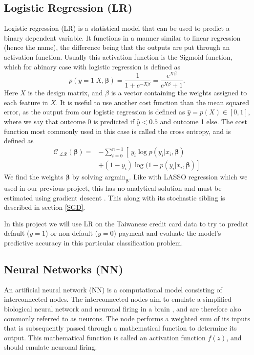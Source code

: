 \documentclass[a4paper, 11pt, twocolumn]{article}
\begin{document}
\subsection{Logistic Regression (LR)}
Logistic regression (LR)  is a statistical model that can be used to predict a
binary dependent variable. It functions in a manner similar to linear regression
(hence the name), the difference being that the outputs are put through an
activation function. Usually this activation function is the Sigmoid function,
which for abinary case with logistic regression is defined as
\begin{equation}
p(y=1 | X, \bm{\beta}) = \frac{1}{1 + e^{-X \beta}} =\frac{e^{X \beta}}{e^{X \beta}+1}.
\label{sigmoid}
\end{equation}
Here $X$ is the design matrix, and $\beta$ is a vector containing the weights
assigned to each
feature in $X$. It is useful to use another cost function than the mean squared
error, as the output
from our logistic regression is defined as $\hat{y}=p(X)\in [0, 1]$, where we
say that outcome 0 is predicted if $\hat{y}< 0.5$ and outcome 1 else. The cost
function most commonly used in this case is called the cross entropy, and is
defined as
\begin{align}
\mathcal{C_\text{ LR}}(\bm{\beta}) =& -\sum_{i=0}^{n-1} \left[\  y_i\log p(y_i|x_i, \bm{\beta}) \right. \nonumber\\
 &\left.+ (1-y_i)\log(1-p(y_i|x_i,\bm{\beta})    \right]
\end{align}
We find the weights $\bm{\beta}$ by solving $\text{argmin}_{\bm{\beta}}$. Like with
LASSO regression which we used in our previous project, this has no analytical
solution and must be estimated using gradient descent \cite{regpaper}. This
along with its stochastic sibling is described in section \ref{SGD}.

In this project we will use LR on the Taiwanese credit card data to try to predict
default ($y=1$) or non-default ($y=0$) payment and evaluate the model's predictive
accuracy in this particular classification problem.

\subsection{Neural Networks (NN)}

An artificial neural network (NN) is a computational model consisting of
interconnected nodes. The interconnected nodes aim to emulate a simplified
biological neural network and neuronal firing in a brain , and are therefore
also commonly referred to as neurons.  The node performs a weighted sum of its
inputs that is subsequently passed through a mathematical function to determine
its output. This mathematical function is called an activation function $f(z)$,
and should emulate neuronal firing.
\end{document}
